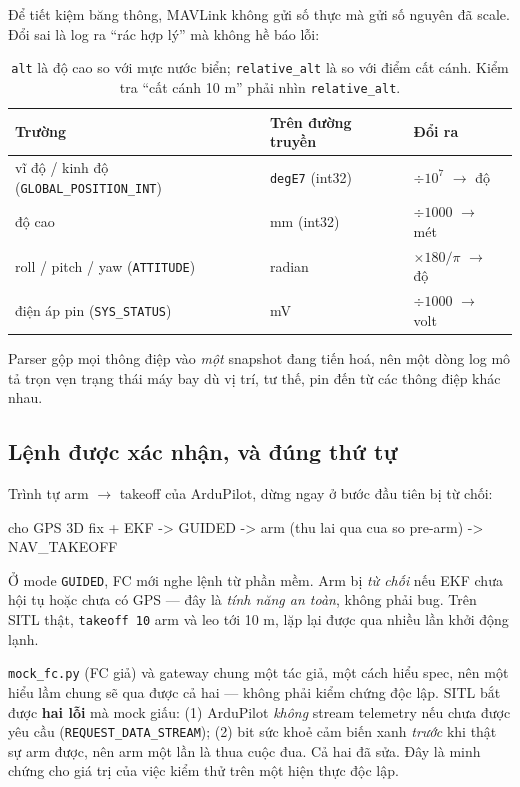 \documentclass[12pt]{ai_conquer2026}
\begin{document}
Để tiết kiệm băng thông, MAVLink không gửi số thực mà gửi số nguyên đã scale. Đổi
sai là log ra ``rác hợp lý'' mà không hề báo lỗi:

\begin{table}[h]
\centering
\begin{tabular}{@{}lll@{}}
\toprule
Trường & Trên đường truyền & Đổi ra \\
\midrule
vĩ độ / kinh độ (\texttt{GLOBAL\_POSITION\_INT}) & \texttt{degE7} (int32) & $\div 10^7$ $\to$ độ \\
độ cao & mm (int32) & $\div 1000$ $\to$ mét \\
roll / pitch / yaw (\texttt{ATTITUDE}) & radian & $\times 180/\pi$ $\to$ độ \\
điện áp pin (\texttt{SYS\_STATUS}) & mV & $\div 1000$ $\to$ volt \\
\bottomrule
\end{tabular}
\caption{\texttt{alt} là độ cao so với mực nước biển; \texttt{relative\_alt} là
so với điểm cất cánh. Kiểm tra ``cất cánh 10 m'' phải nhìn \texttt{relative\_alt}.}
\end{table}

Parser gộp mọi thông điệp vào \emph{một} snapshot đang tiến hoá, nên một dòng log
mô tả trọn vẹn trạng thái máy bay dù vị trí, tư thế, pin đến từ các thông điệp
khác nhau.

\subsection{Lệnh được xác nhận, và đúng thứ tự}

Trình tự arm $\to$ takeoff của ArduPilot, dừng ngay ở bước đầu tiên bị từ chối:

\begin{aivnoutputbox}
cho GPS 3D fix + EKF  ->  GUIDED  ->  arm (thu lai qua cua so pre-arm)  ->  NAV_TAKEOFF
\end{aivnoutputbox}

Ở mode \texttt{GUIDED}, FC mới nghe lệnh từ phần mềm. Arm bị \emph{từ chối} nếu
EKF chưa hội tụ hoặc chưa có GPS --- đây là \emph{tính năng an toàn}, không phải
bug. Trên SITL thật, \texttt{takeoff 10} arm và leo tới 10 m, lặp lại được qua
nhiều lần khởi động lạnh.

\begin{aivncodebox}
\texttt{mock\_fc.py} (FC giả) và gateway chung một tác giả, một cách hiểu spec,
nên một hiểu lầm chung sẽ qua được cả hai --- không phải kiểm chứng độc lập. SITL
bắt được \textbf{hai lỗi} mà mock giấu: (1) ArduPilot \emph{không} stream telemetry
nếu chưa được yêu cầu (\texttt{REQUEST\_DATA\_STREAM}); (2) bit sức khoẻ cảm biến
xanh \emph{trước} khi thật sự arm được, nên arm một lần là thua cuộc đua. Cả hai
đã sửa. Đây là minh chứng cho giá trị của việc kiểm thử trên một hiện thực độc
lập.
\end{aivncodebox}
\end{document}
